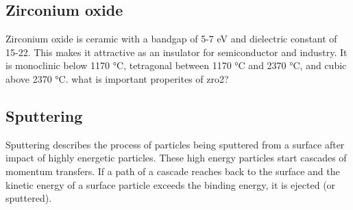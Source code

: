 \subsection{Zirconium oxide}
Zirconium oxide  is ceramic with a bandgap of 5-7 eV and dielectric constant of 15-22\cite{Anwar2017}. 
This makes it attractive as an insulator for semiconductor and  industry. 
It is monoclinic below 1170 °C, tetragonal between 1170 °C and 2370 °C, and cubic above 2370 °C. 
what is important properites of zro2? 

\subsection{Sputtering}
Sputtering describes the process of particles being sputtered from a surface after 
impact of highly energetic particles.
These high energy particles start cascades of momentum transfers. 
If a path of a cascade reaches back to the surface and the kinetic energy of a surface 
particle exceeds the binding energy, it is ejected (or sputtered).

